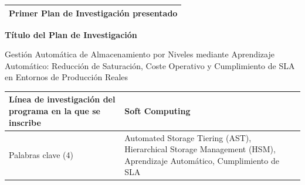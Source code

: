 \documentclass[12pt, a4paper]{article}
\begin{document}
\begin{center}
    \colorbox{blue!5}{
    }
\end{center}

\vspace{1cm}

\noindent
\begin{tabularx}{\textwidth}{|X|}
    \hline
    \rowcolor{grisCabecera} \textbf{\large Primer Plan de Investigación presentado} \\
    \hline
\end{tabularx}

\vspace{0.3cm}

\begin{center}
    \color{azulTitulo}\textbf{Título del Plan de Investigación}
\end{center}
\noindent
Gestión Automática de Almacenamiento por Niveles mediante Aprendizaje Automático: Reducción de Saturación, Coste Operativo y Cumplimiento de SLA en Entornos de Producción Reales

\vspace{0.4cm}

\noindent
\begin{tabularx}{\textwidth}{|l|X|}
    \hline
    \rowcolor{azulCelda} Línea de investigación del programa en la que se inscribe & Soft Computing \\
    \hline
    \rowcolor{azulCelda} Palabras clave (4) & Automated Storage Tiering (AST), Hierarchical Storage Management (HSM), Aprendizaje Automático, Cumplimiento de SLA \\
    \hline
\end{tabularx}

\vspace{1.5cm}








\end{document}
